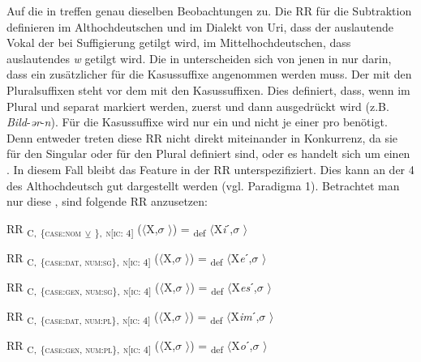 Auf die  in  treffen genau dieselben Beobachtungen zu. Die RR für die Subtraktion definieren im Althochdeutschen und im Dialekt von Uri, dass der auslautende Vokal der  bei Suffigierung getilgt wird, im Mittelhochdeutschen, dass auslautendes \textit{w} getilgt wird. Die  in  unterscheiden sich von jenen in  nur darin, dass ein zusätzlicher  für die Kasussuffixe angenommen werden muss. Der  mit den Pluralsuffixen steht vor dem  mit den Kasussuffixen. Dies definiert, dass, wenn im Plural  und  separat markiert werden, zuerst  und dann  ausgedrückt wird (z.B. \textit{Bild}-\textit{ər}-\textit{n}). Für die Kasussuffixe wird nur ein  und nicht je einer pro  benötigt. Denn entweder treten diese RR nicht direkt miteinander in Konkurrenz, da sie für den Singular oder für den Plural definiert sind, oder es handelt sich um einen . In diesem Fall bleibt das Feature  in der RR unterspezifiziert. Dies kann an der  4 des Althochdeutsch gut dargestellt werden (vgl. Paradigma 1). Betrachtet man nur diese , sind folgende RR anzusetzen:

\ea%
\label{ex:key:68}
 RR \textsubscript{C,} \textsubscript{\{\textsc{case:nom}} \textsubscript{\tiny $\veebar$}\textsubscript{ \AKK\},} \textsubscript{\textsc{n[}\textsc{ic:} 4]} ($\langle$X,$\sigma$ $\rangle$) = \textsubscript{def} $\langle$X\textit{i}ˊ,$\sigma$ $\rangle$
\z

\ea%
\label{ex:key:69}
 RR \textsubscript{C,} \textsubscript{\{\textsc{case:dat}, \textsc{num:sg}\},} \textsubscript{\textsc{n[}\textsc{ic:} 4]} ($\langle$X,$\sigma$ $\rangle$) = \textsubscript{def} $\langle$X\textit{e}ˊ,$\sigma$ $\rangle$
\z

\ea%
\label{ex:key:70}
 RR \textsubscript{C,} \textsubscript{\{\textsc{case:gen}, \textsc{num:sg}\},} \textsubscript{\textsc{n[}\textsc{ic:} 4]} ($\langle$X,$\sigma$ $\rangle$) = \textsubscript{def} $\langle$X\textit{es}ˊ,$\sigma$ $\rangle$
\z

\ea%
\label{ex:key:71}
 RR \textsubscript{C,} \textsubscript{\{\textsc{case:dat}, \textsc{num:pl}\},} \textsubscript{\textsc{n[}\textsc{ic:} 4]} ($\langle$X,$\sigma$ $\rangle$) = \textsubscript{def} $\langle$X\textit{im}ˊ,$\sigma$ $\rangle$
\z

\ea%
\label{ex:key:72}
 RR \textsubscript{C,} \textsubscript{\{\textsc{case:gen}, \textsc{num:pl}\},} \textsubscript{\textsc{n[}\textsc{ic:} 4]} ($\langle$X,$\sigma$ $\rangle$) = \textsubscript{def} $\langle$X\textit{o}ˊ,$\sigma$ $\rangle$
\z


